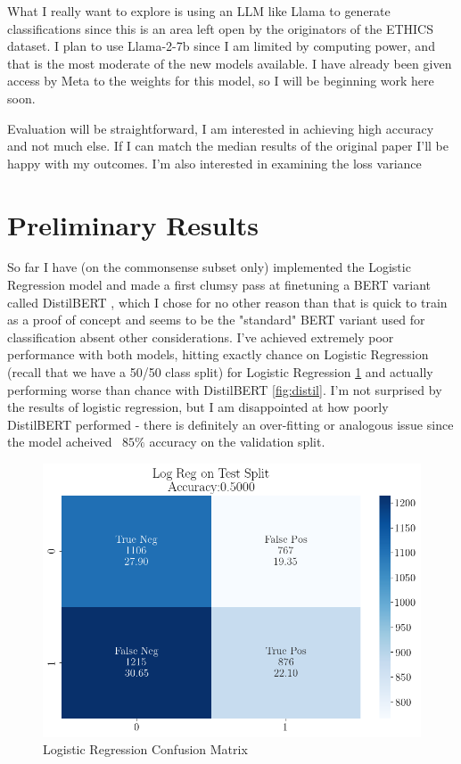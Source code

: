 \documentclass[11pt,a4paper]{article}
\begin{document}
What I really want to explore is using an LLM like Llama to generate classifications since this is an area left open by the originators of the ETHICS dataset. I plan to use Llama-2-7b since I am limited by computing power, and that is the most moderate of the new models available. I have already been given access by Meta to the weights for this model, so I will be beginning work here soon.

Evaluation will be straightforward, I am interested in achieving high accuracy and not much else. If I can match the median results of the original paper I'll be happy with my outcomes. I'm also interested in examining the loss variance

\section{Preliminary Results}

So far I have (on the commonsense subset only) implemented the Logistic Regression model and made a first clumsy pass at finetuning a BERT variant called DistilBERT \cite{sanh2020distilbert}, which I chose for no other reason than that is quick to train as a proof of concept and seems to be the "standard" BERT variant used for classification absent other considerations. I've achieved extremely poor performance with both models, hitting exactly chance on Logistic Regression (recall that we have a 50/50 class split) for Logistic Regression \ref{fig:log_reg} and actually performing worse than chance with DistilBERT \ref{fig:distil}. I'm not surprised by the results of logistic regression, but I am disappointed at how poorly DistilBERT performed - there is definitely an over-fitting or analogous issue since the model acheived ~$85\%$ accuracy on the validation split.

\begin{figure}
  \centering
  \includegraphics[width=\columnwidth]{log_reg.png}
  \caption{Logistic Regression Confusion Matrix}
  \label{fig:log_reg}
\end{figure}
\end{document}

